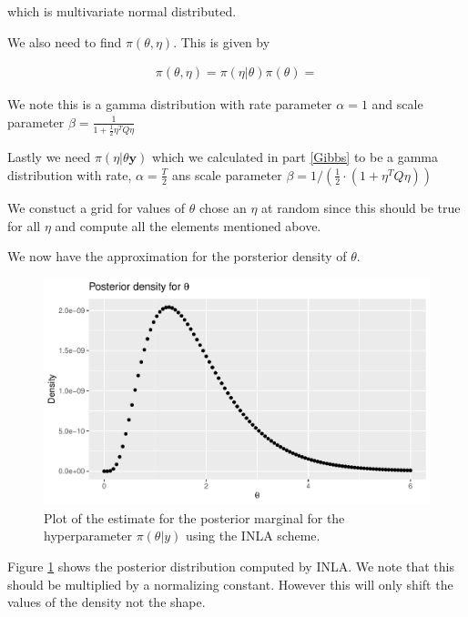 which is multivariate normal distributed. 

We also need to find $\pi(\theta, \eta)$. This is given by 

\begin{align}
  \pi(\theta, \eta) = \pi(\eta|\theta)\pi(\theta)
  = 
\end{align}




We note this is a gamma distribution with rate parameter $\alpha = 1$ and scale parameter $\beta = \frac{1}{1 + \frac{1}{2} \eta^{T} Q \eta}$

Lastly we need $\pi(\eta| \theta \boldsymbol{y})$ which we calculated in part \ref{Gibbs} to be a gamma distribution with rate, $\alpha = \frac{T}{2}$ ans scale parameter $\beta = 1/(\frac{1}{2}\cdot (1 + \eta^T Q \eta))$ 

We constuct a grid for values of $\theta$ chose an $\eta$ at random since this should be true for all $\eta$ and compute all the elements mentioned above.  





We now have the approximation for the porsterior density of $\theta$.
\begin{figure}[h!]
    \centering
    \includegraphics[width=\textwidth]{Images/post_theta_inla.pdf}
    \caption{Plot of the estimate for the posterior marginal for the hyperparameter $\pi(\theta|y)$ using the INLA scheme.}
    \label{fig:post_theta_inla}
\end{figure}

Figure \ref{fig:post_theta_inla} shows the posterior distribution computed by INLA. We note that this should be multiplied by a normalizing constant. However this will only shift the values of the density not the shape. 

